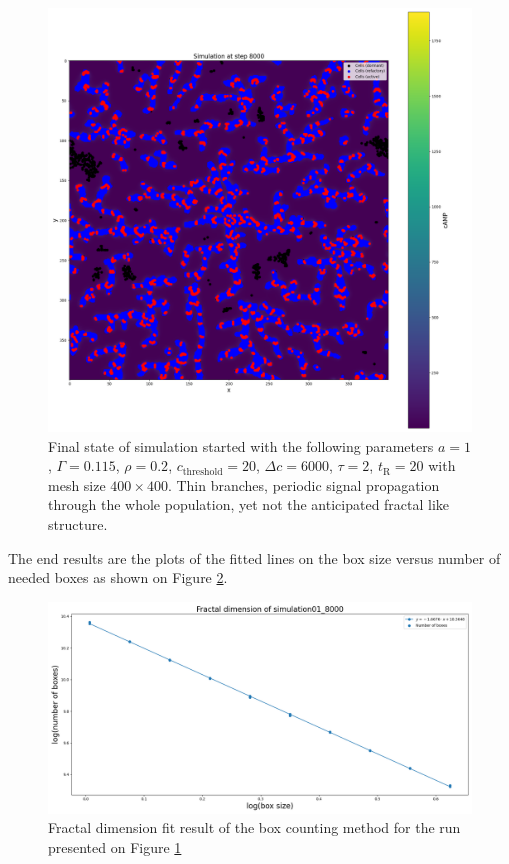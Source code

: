 \documentclass[a4paper,12pt]{article}
\begin{document}
\begin{figure}
\centering
 \includegraphics[width=\textwidth]{result.png}
 \caption{Final state of simulation started with the following parameters $a=1$, $\Gamma=0.115$, $\rho=0.2$, $c_\text{threshold}=20$, $\Delta c=6000$, $\tau=2$, $t_\text{R}=20$ with mesh size $400 \times 400$. Thin branches, periodic signal propagation through the whole population, yet not the anticipated fractal like structure.}
 \label{fig:result}
\end{figure}

The end results are the plots of the fitted lines on the box size versus number of needed boxes as shown on Figure \ref{fig:fractalfit}.

\begin{figure}
\centering
 \includegraphics[width=\textwidth]{fractalfit.png}
 \caption{Fractal dimension fit result of the box counting method for the run presented on Figure \ref{fig:result}}
 \label{fig:fractalfit}
\end{figure}
\end{document}
